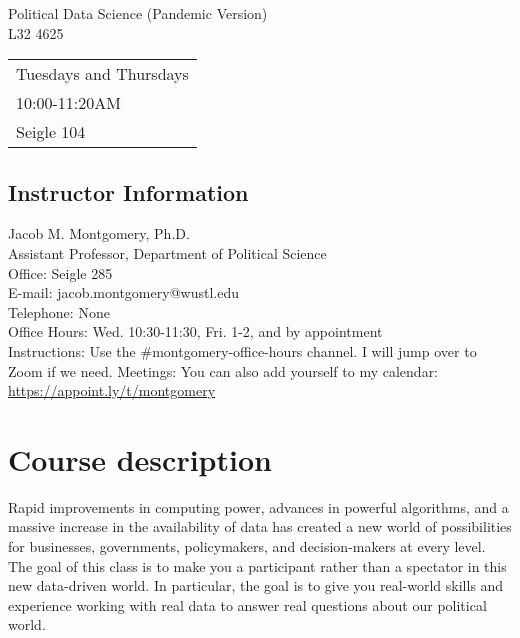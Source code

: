 \documentclass[11pt]{article}
\begin{document}
\pagestyle{plain} 

\begin{center}

\vspace{5pt}
\Large{Political Data Science (Pandemic Version) }\\
\Large{L32 4625}
\vspace{4 mm}

\small


\vspace{4 mm}

     \begin{tabular}{l }
       Tuesdays and Thursdays\\
      10:00-11:20AM \\
      Seigle 104
       \end{tabular}
\end{center}

\subsection*{Instructor Information}

\noindent Jacob M. Montgomery, Ph.D.\\
\noindent Assistant Professor, Department of Political Science\\
Office: Seigle 285\\
E-mail: jacob.montgomery@wustl.edu\\
Telephone: None \\
Office Hours: Wed. 10:30-11:30, Fri. 1-2,  and by appointment \\
Instructions: Use the \#montgomery-office-hours channel.  I will jump over to Zoom if we need.
Meetings: You can also add yourself to my calendar: \url{https://appoint.ly/t/montgomery}

\section*{Course description}


Rapid improvements in computing power, advances in powerful
algorithms, and a massive increase in the availability of data has
created a new world of possibilities for businesses, governments,
policymakers, and decision-makers at every level. The goal of this
class is to make you a participant rather than a spectator in this new
data-driven world.  In particular, the goal is to give you real-world
skills and experience working with real data to answer real questions
about our political world.
\end{document}
